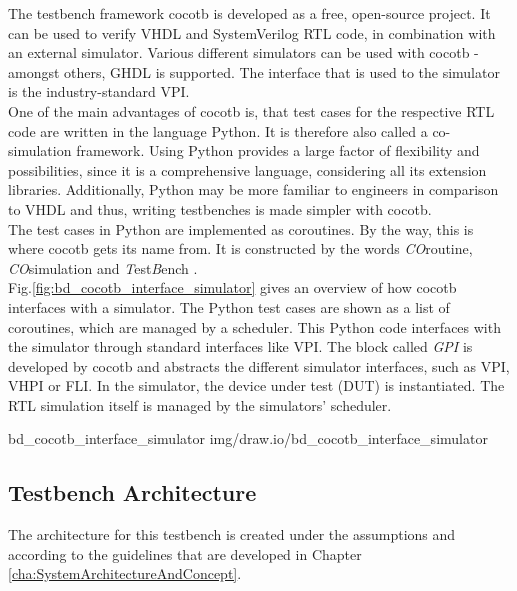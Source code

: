 The testbench framework cocotb is developed as a free, open-source project.
It can be used to verify VHDL and SystemVerilog RTL code, in combination with an external simulator.
Various different simulators can be used with cocotb - amongst others, GHDL is supported.
The interface that is used to the simulator is the industry-standard VPI.\\

One of the main advantages of cocotb is, that test cases for the respective RTL code are written in the language Python.
It is therefore also called a co-simulation framework.
Using Python provides a large factor of flexibility and possibilities, since it is a comprehensive language, considering all its extension libraries.
Additionally, Python may be more familiar to engineers in comparison to VHDL and thus, writing testbenches is made simpler with cocotb.\\

The test cases in Python are implemented as coroutines.
By the way, this is where cocotb gets its name from.
It is constructed by the words \textit{CO}routine, \textit{CO}simulation and \textit{T}est\textit{B}ench \cite{cocotbDoc}.\\

Fig.\ref{fig:bd_cocotb_interface_simulator} gives an overview of how cocotb interfaces with a simulator.
The Python test cases are shown as a list of coroutines, which are managed by a scheduler.
This Python code interfaces with the simulator through standard interfaces like VPI.
The block called \textit{GPI} is developed by cocotb and abstracts the different simulator interfaces, such as VPI, VHPI or FLI.
In the simulator, the device under test (DUT) is instantiated.
The RTL simulation itself is managed by the simulators' scheduler.

 {bd_cocotb_interface_simulator} {img/draw.io/bd_cocotb_interface_simulator}

\subsection{Testbench Architecture}
\label{sub:VHDL:TestbenchArchitecture}

The architecture for this testbench is created under the assumptions and according to the guidelines that are developed in Chapter \ref{cha:SystemArchitectureAndConcept}.\\

